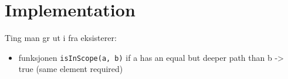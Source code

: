 \chapter{Implementation}
\label{chapter:implementation}

Ting man g\a r ut i fra eksisterer:
\begin{itemize}
\item funksjonen \verb!isInScope(a, b)! if a has an equal but deeper path than b -> true (same element required)
\end{itemize}